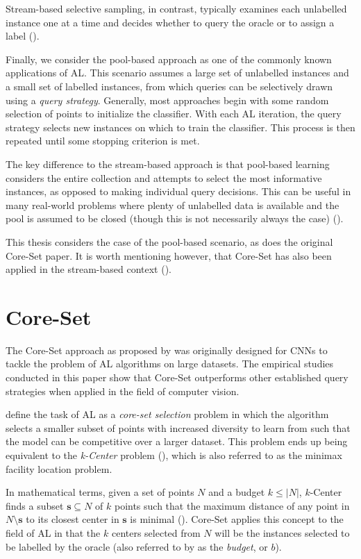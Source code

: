 \documentclass[english,bachelor,ul]{webisthesis} %
\begin{document}
Stream-based selective sampling, in contrast, typically examines each unlabelled instance one at a time and decides whether to query the oracle or to assign a label (\cite{settles.tr09}).

Finally, we consider the pool-based approach as one of the commonly known applications of AL. This scenario assumes a large set of unlabelled instances and a small set of labelled instances, from which queries can be selectively drawn using a \textit{query strategy}. Generally, most approaches begin with some random selection of points to initialize the classifier. With each AL iteration, the query strategy selects new instances on which to train the classifier. This process is then repeated until some stopping criterion is met. 

The key difference to the stream-based approach is that pool-based learning considers the entire collection and attempts to select the most informative instances, as opposed to making individual query decisions. This can be useful in many real-world problems where plenty of unlabelled data is available and the pool is assumed to be closed (though this is not necessarily always the case) (\cite{settles.tr09}).

This thesis considers the case of the pool-based scenario, as does the original Core-Set paper. It is worth mentioning however, that Core-Set has also been applied in the stream-based context (\cite{DBLP:conf/icml/SaranYK0A23}).

\section{Core-Set}

The Core-Set approach as proposed by \cite{DBLP:conf/iclr/SenerS18} was originally designed for CNNs to tackle the problem of AL algorithms on large datasets. The empirical studies conducted in this paper show that Core-Set outperforms other established query strategies when applied in the field of computer vision.

\cite{DBLP:conf/iclr/SenerS18} define the task of AL as a \textit{core-set selection} problem in which the algorithm selects a smaller subset of points with increased diversity to learn from such that the model can be competitive over a larger dataset. This problem ends up being equivalent to the \textit{k-Center} problem (\cite{DBLP:conf/iclr/SenerS18}), which is also referred to as the minimax facility location problem. 

In mathematical terms, given a set of points $ N $ and a budget $ k \leq |N| $, $k$-Center finds a subset $ \mathbf{s} \subseteq N $ of $ k $ points such that the maximum distance of any point in $ N \setminus \mathbf{s} $ to its closest center in $ \mathbf{s} $ is minimal (\cite{har2008geometric}). Core-Set applies this concept to the field of AL in that the $ k $ centers selected from $ N $ will be the instances selected to be labelled by the oracle (also referred to by \cite{DBLP:conf/iclr/SenerS18} as the \textit{budget}, or $ b $).
\end{document}
